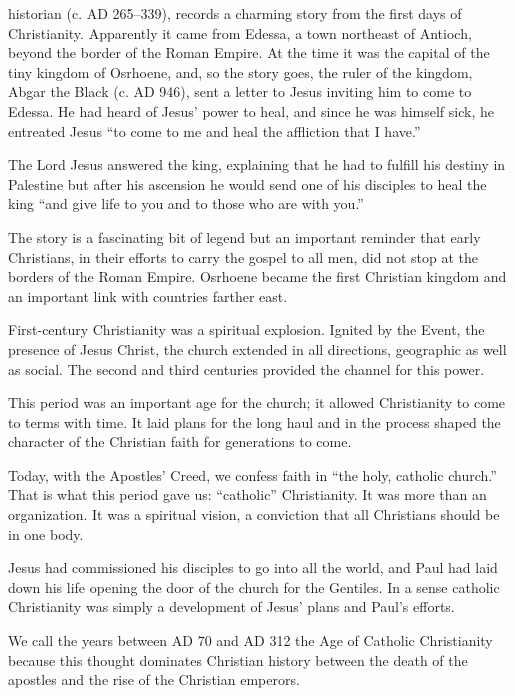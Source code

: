 
 historian (c. AD 265–339), records a charming story from
the first days of Christianity. Apparently it came from Edessa, a town northeast of Antioch, beyond
the border of the Roman Empire. At the time it was the capital of the tiny kingdom of Osrhoene, and,
so the story goes, the ruler of the kingdom, Abgar the Black (c. AD 946), sent a letter to Jesus
inviting him to come to Edessa. He had heard of Jesus’ power to heal, and since he was himself sick,
he entreated Jesus “to come to me and heal the affliction that I have.”

The Lord Jesus answered the king, explaining that he had to fulfill his destiny in Palestine but
after his ascension he would send one of his disciples to heal the king “and give life to you and to
those who are with you.”

The story is a fascinating bit of legend but an important reminder that early Christians, in their
efforts to carry the gospel to all men, did not stop at the borders of the Roman Empire. Osrhoene
became the first Christian kingdom and an important link with countries farther east.

First-century Christianity was a spiritual explosion. Ignited by the Event, the presence of Jesus
Christ, the church extended in all directions, geographic as well as social. The second and third
centuries provided the channel for this power.

This period was an important age for the church; it allowed Christianity to come to terms with time.
It laid plans for the long haul and in the process shaped the character of the Christian faith for
generations to come.

Today, with the Apostles’ Creed, we confess faith in “the holy, catholic church.” That is what this
period gave us: “catholic” Christianity. It was more than an organization. It was a spiritual
vision, a conviction that all Christians should be in one body.

Jesus had commissioned his disciples to go into all the world, and Paul had laid down his life
opening the door of the church for the Gentiles. In a sense catholic Christianity was simply a
development of Jesus’ plans and Paul’s efforts.

We call the years between AD 70 and AD 312 the Age of Catholic Christianity because this thought
dominates Christian history between the death of the apostles and the rise of the Christian
emperors.

